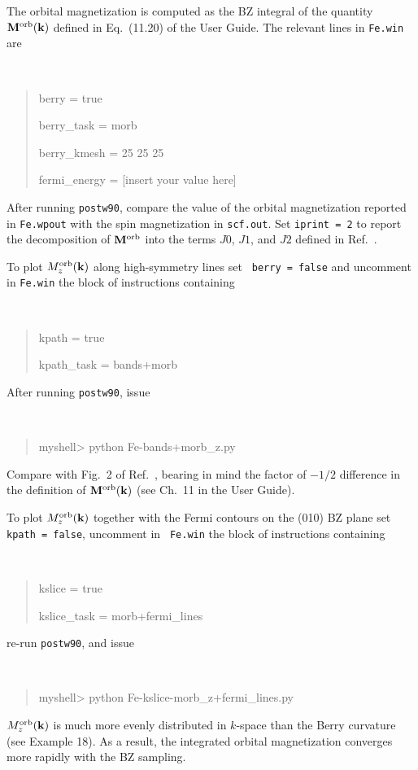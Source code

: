 \documentclass[a4paper,11pt,twoside]{article}
\begin{document}
The orbital magnetization is computed as the BZ integral of the
quantity ${\bf M}^{\rm orb}({\bf k})$ defined in Eq.~(11.20) of the
User Guide. The relevant lines in {\tt Fe.win} are
%
{\tt
\begin{quote}
berry = true

berry\_task = morb

berry\_kmesh = 25 25 25

fermi\_energy = [insert your value here]
\end{quote} }
%
After running {\tt postw90}, compare the value of the orbital
magnetization reported in {\tt Fe.wpout} with the spin magnetization
in {\tt scf.out}. Set {\tt iprint = 2} to report the decomposition of
${\bf M}^{\rm orb}$ into the terms $J0$, $J1$, and $J2$ defined in
Ref.~\cite{lopez-prb12}.

To plot $M_z^{\rm orb}({\bf k})$ along high-symmetry lines set {\tt
  berry = false} and uncomment in {\tt Fe.win} the block of
instructions containing {\tt
\begin{quote}
kpath = true

kpath\_task = bands+morb
\end{quote}
}
After running {\tt postw90}, issue
%
{\tt
\begin{quote}
myshell> python Fe-bands+morb\_z.py
\end{quote} } 
%
Compare with Fig.~2 of Ref.~\cite{lopez-prb12}, bearing in mind the
factor of $-1/2$ difference in the definition of ${\bf M}^{\rm
  orb}({\bf k})$ (see Ch.~11 in the User Guide).

To plot $M_z^{\rm orb}({\bf k})$ together with the Fermi contours on the
(010) BZ plane set {\tt kpath = false}, uncomment in {\tt
  Fe.win} the block of instructions containing 
{\tt
\begin{quote}
kslice = true

kslice\_task = morb+fermi\_lines
\end{quote}
} 
re-run {\tt postw90}, and issue
{\tt
\begin{quote}
myshell> python Fe-kslice-morb\_z+fermi\_lines.py
\end{quote} }
%
$M_z^{\rm orb}({\bf k})$ is much more evenly distributed in $k$-space
than the Berry curvature (see Example 18). As a result, the integrated
orbital magnetization converges more rapidly with the BZ sampling.





\end{document}

